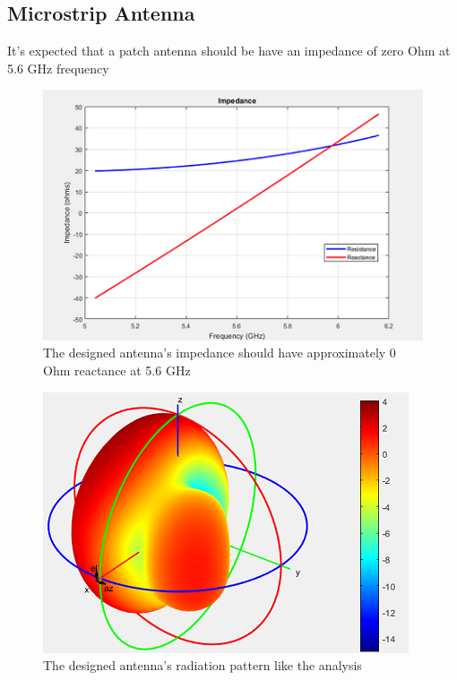 \documentclass[11pt,a4paper]{article}
\begin{document}
    \subsection{Microstrip Antenna}
      \indent It's expected that a patch antenna should be have an impedance of zero Ohm at 5.6 GHz frequency
      \begin{figure}[ht]
        \includegraphics{Impedance.png}
        \centering
        \caption{The designed antenna's impedance should have approximately 0 Ohm reactance at 5.6 GHz}
      \end{figure}

      \begin{figure}[ht]
        \includegraphics{Radiation_pattern}
        \centering
        \caption{The designed antenna's radiation pattern like the analysis}
      \end{figure}

  \pagebreak
\end{document}
